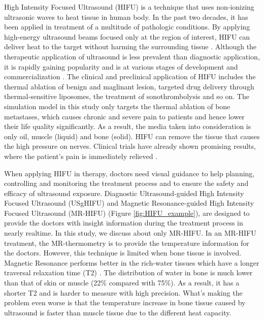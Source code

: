 
High Intensity Focused Ultrasound (HIFU) is a technique that uses non-ionizing ultrasonic waves to heat tissue in human body. In the past two decades, it has been applied in treatment of a multitude of pathologic conditions. By applying high-energy ultrasound beams focused only at the region of interest, HIFU can deliver heat to the target without harming the surrounding tissue \cite{JENNE2012311}. Although the therapeutic application of ultrasound is less prevalent than diagnostic application, it is rapidly gaining popularity and is at various stages of development and commercialization \cite{wp_HIFU}. The clinical and preclinical application of HIFU includes the thermal ablation of benign and maglinant lesion, targeted drug delivery through thermal-sensitive liposomes, the treatment of sonothrombolysis and so on. The simulation model in this study only targets the thermal ablation of bone metastases, which causes chronic and severe pain to patients and hence lower their life quality significantly. As a result, the media taken into consideration is only oil, muscle (liquid) and bone (solid). HIFU can remove the tissue that causes the high pressure on nerves. Clinical trials have already shown promising results, where the patient's pain is immediately relieved \cite{vanwijk2013}.

When applying HIFU in therapy, doctors need visual guidance to help planning, controlling and monitoring the treatment process and to ensure the safety and efficacy of ultrasound exposure. Diagnostic Ultrasound-guided High Intensity Focused Ultrasound (USgHIFU) and Magnetic Resonance-guided High Intensity Focused Ultrasound (MR-HIFU) (Figure \ref{fig:HIFU_example}), are designed to provide the doctors with insight information during the treatment process in nearly realtime. In this study, we discuss about only MR-HIFU. In an MR-HIFU treatment, the MR-thermometry is to provide the temperature information for the doctors. However, this technique is limited when bone tissue is involved. Magnetic Resonance performs better in the rich-water tissues which have a longer traversal relaxation time (T2) \cite{Modena_2018}. The distribution of water in bone is much lower than that of skin or muscle (22\% compared with 75\%). As a result, it has a shorter T2 and is harder to measure with high precision. What's making the problem even worse is that the temperature increase in bone tissue caused by ultrasound is faster than muscle tissue due to the different heat capacity.

